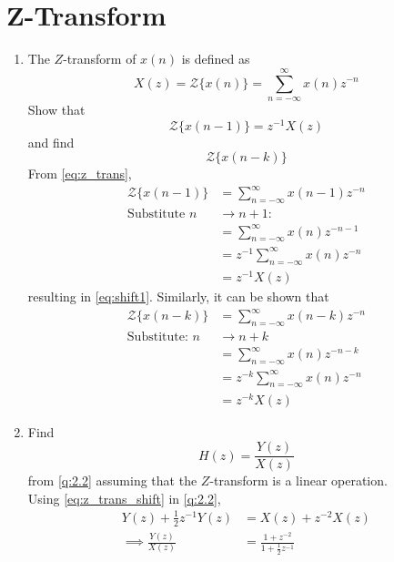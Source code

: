 \documentclass[journal,12pt,twocolumn]{IEEEtran}
\theoremstyle{remark}
\renewcommand\thesection{\arabic{section}}
\numberwithin{equation}{subsection}
\begin{document}
\section{Z-Transform}

\begin{enumerate}[label=\thesection.\arabic*]
\item The $Z$-transform of $x(n)$ is defined as
%
\begin{equation}
\label{eq:z_trans}
X(z)={\mathcal {Z}}\{x(n)\}=\sum _{n=-\infty }^{\infty }x(n)z^{-n}
\end{equation}
%
Show that
\begin{equation}
\label{eq:shift1}
{\mathcal {Z}}\{x(n-1)\} = z^{-1}X(z)
\end{equation}
and find
\begin{equation}
	{\mathcal {Z}}\{x(n-k)\} 
\end{equation}
\solution From \eqref{eq:z_trans},
\begin{align}
{\mathcal {Z}}\{x(n-1)\} &=\sum _{n=-\infty }^{\infty }x(n-1)z^{-n}\\
\text{Substitute }n &\rightarrow n+1:\\ \nonumber
&=\sum _{n=-\infty }^{\infty }x(n)z^{-n-1} \\
&= z^{-1}\sum _{n=-\infty }^{\infty }x(n)z^{-n}\\
&= z^{-1}X(z)
\end{align}
resulting in \eqref{eq:shift1}. Similarly, it can be shown that
%
\begin{align}
{\mathcal {Z}}\{x(n-k)\} &=\sum _{n=-\infty }^{\infty }x(n-k)z^{-n}\\
\text{Substitute: }n &\rightarrow n+k \nonumber\\
&=\sum _{n=-\infty }^{\infty }x(n)z^{-n-k} \\
&= z^{-k}\sum _{n=-\infty }^{\infty }x(n)z^{-n}\\
&= z^{-k}X(z) \label{eq:z_trans_shift}
\end{align}
\item Find
%
\begin{equation}
H(z) = \frac{Y(z)}{X(z)}
\end{equation}
from  \eqref{q:2.2} assuming that the $Z$-transform is a linear operation.
\\
\solution  Using \eqref{eq:z_trans_shift} in \eqref{q:2.2},
\begin{align}
Y(z) + \frac{1}{2}z^{-1}Y(z) &= X(z)+z^{-2}X(z)
\\
\implies \frac{Y(z)}{X(z)} &= \frac{1 + z^{-2}}{1 + \frac{1}{2}z^{-1}}

\end{align}
\end{enumerate}
\end{document}
